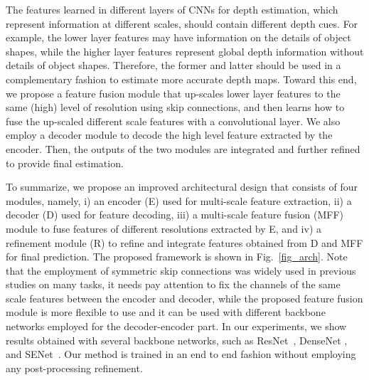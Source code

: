 \documentclass[10pt,twocolumn,letterpaper]{article}
\begin{document}
The features learned in different layers of CNNs for depth estimation, which represent information at different scales, should contain different depth cues. For example, the lower layer features may have information on 
the details of object shapes, while the higher layer features represent global depth information without details of object shapes. 
Therefore, 
the former and latter should be used in a complementary fashion to estimate more accurate depth maps. 
Toward this end, we propose a feature fusion module that up-scales lower layer features to the same (high) level of resolution using skip connections, and then learns how to fuse the up-scaled different scale features with a convolutional layer. 
We also employ a decoder module to decode the high level feature extracted by the encoder.
Then, the outputs of the two modules are integrated and further refined to provide final estimation. 

To summarize, we propose an improved architectural design that consists of four modules, namely, i) an encoder (E) used for multi-scale feature extraction, ii) a decoder (D) used for feature decoding, iii) a multi-scale feature fusion (MFF) module to fuse features of different resolutions extracted by E, and iv) a refinement module (R) to refine and integrate features obtained from D and MFF for final prediction. The proposed framework is shown in Fig.~\ref{fig_arch}.
Note that the employment of symmetric skip connections was widely used in previous studies on many tasks, it needs pay attention to fix the channels of the same scale features between the encoder and decoder, while the proposed feature fusion module is more flexible to use and it can be used with different backbone networks employed for the decoder-encoder part.
In our experiments, we show results obtained with several backbone networks, such as ResNet~\cite{he2016deep}, DenseNet \cite{huang2016densely}, and SENet~\cite{hu2018senet}. 
Our method is trained in an end to end fashion without employing any post-processing refinement. 

\begin{figure*}[t]
\centering
{}
\caption{A diagram of the proposed network architecture. Given an input image, the encoder (E) extracts multi-scale features (1/4, 1/8, 1/16, and 1/32). The decoder (D) converts the last 1/32 scale feature to get a 1/2 scale feature. Each of the multi-scale features is up-scaled to 1/2 scale, and fused by the multi-scale feature fusion module (MFF). The outputs of D and MFF and are refined by the refinement module (R) to obtain the final depth map. Each box named ``block'' denotes a block of multiple convolutional layers, such as residual block of ResNet;
each box named ``up'' denotes a up-projection layer introduced in \cite{laina2016deeper}. Batch normalization and ReLU nonlinearity are applied to the output of each convolutional layer except conv6.} 
\label{fig_arch}
\end{figure*}
\end{document}
